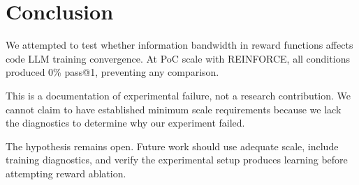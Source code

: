 \section{Conclusion}
\label{sec:conclusion}

We attempted to test whether information bandwidth in reward functions affects code LLM training convergence. At PoC scale with REINFORCE, all conditions produced 0\% pass@1, preventing any comparison.

This is a documentation of experimental failure, not a research contribution. We cannot claim to have established minimum scale requirements because we lack the diagnostics to determine why our experiment failed.

The hypothesis remains open. Future work should use adequate scale, include training diagnostics, and verify the experimental setup produces learning before attempting reward ablation.
